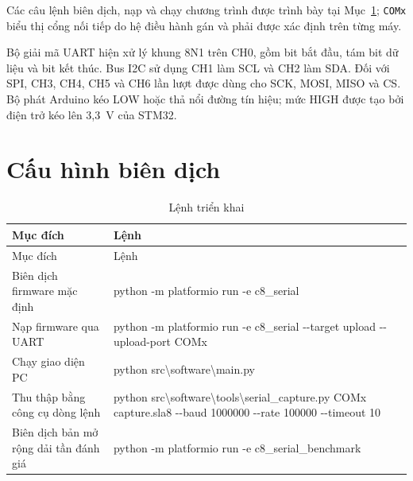 Các câu lệnh biên dịch, nạp và chạy chương trình được trình bày tại Mục~\ref{sec:build-config}; \texttt{COMx} biểu thị cổng nối tiếp do hệ điều hành gán và phải được xác định trên từng máy.

Bộ giải mã UART hiện xử lý khung 8N1 trên CH0, gồm bit bắt đầu, tám bit dữ liệu và bit kết thúc. Bus I2C sử dụng CH1 làm SCL và CH2 làm SDA. Đối với SPI, CH3, CH4, CH5 và CH6 lần lượt được dùng cho SCK, MOSI, MISO và CS. Bộ phát Arduino kéo LOW hoặc thả nổi đường tín hiệu; mức HIGH được tạo bởi điện trở kéo lên 3,3~V của STM32.

\clearpage
\section{Cấu hình biên dịch}\label{sec:build-config}

\begin{longtable}[]{@{}|
  >{\raggedright\arraybackslash}p{}
  |>{\raggedright\arraybackslash}p{}|@{}}
\caption{Lệnh triển khai}\tabularnewline
\hline
\begin{minipage}[b]{\linewidth}\raggedright
Mục đích
\end{minipage} & \begin{minipage}[b]{\linewidth}\raggedright
Lệnh
\end{minipage} \\ \hline

\endfirsthead
\hline
\begin{minipage}[b]{\linewidth}\raggedright
Mục đích
\end{minipage} & \begin{minipage}[b]{\linewidth}\raggedright
Lệnh
\end{minipage} \\ \hline

\endhead

\endlastfoot
Biên dịch firmware mặc định & python -m platformio run -e c8\_serial \\ \hline
Nạp firmware qua UART & python -m platformio run -e c8\_serial -\/-target upload -\/-upload-port COMx \\ \hline
Chạy giao diện PC & python src\textbackslash software\textbackslash main.py \\ \hline
Thu thập bằng công cụ dòng lệnh & python src\textbackslash software\textbackslash tools\textbackslash serial\_capture.py COMx capture.sla8 -\/-baud 1000000 -\/-rate 100000 -\/-timeout 10 \\ \hline
Biên dịch bản mở rộng dải tần đánh giá & python -m platformio run -e c8\_serial\_benchmark \\ \hline
\end{longtable}

